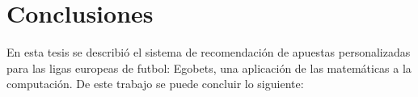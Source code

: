 %
\chapter{Conclusiones}

En esta tesis se describió el sistema de recomendación de apuestas personalizadas para las ligas europeas de futbol: Egobets, una aplicación de las matemáticas a la computación. De este trabajo se puede concluir lo siguiente:



